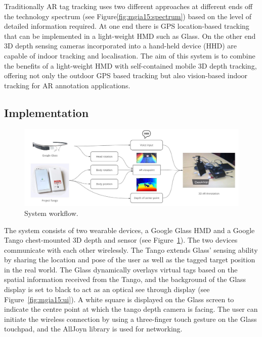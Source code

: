 Traditionally AR tag tracking uses two different approaches at different ends off the technology spectrum (see Figure\ref{fig:mgia15:spectrum}) based on the level of detailed information required. At one end there is GPS location-based tracking that can be implemented in a light-weight HMD such as Glass. On the other end 3D depth sensing cameras incorporated into a hand-held device (HHD) are capable of indoor tracking and localisation. The aim of this system is to combine the benefits of a light-weight HMD with self-contained mobile 3D depth tracking, offering not only the outdoor GPS based tracking but also vision-based indoor tracking for AR annotation applications. 

\subsection{Implementation}

\begin{figure}
  \centering
  \includegraphics[width=\linewidth]{images/mgia15/mgia2015-system.jpg}
  \caption{System workflow.}
  \label{framework}
\end{figure}

The system consists of two wearable devices, a Google Glass HMD and a Google Tango chest-mounted 3D depth and sensor (see Figure~\ref{framework}). The two devices communicate with each other wirelessly. The Tango extends Glass' sensing ability by sharing the location and pose of the user as well as the tagged target position in the real world. The Glass dynamically overlays virtual tags based on the spatial information received from the Tango, and the background of the Glass display is set to black to act as an optical see through display (see Figure~\ref{fig:mgia15:ui}). A white square is displayed on the Glass screen to indicate the centre point at which the tango depth camera is facing. The user can initiate the wireless connection by using a three-finger touch gesture on the Glass touchpad, and the AllJoyn library  is used for networking.

